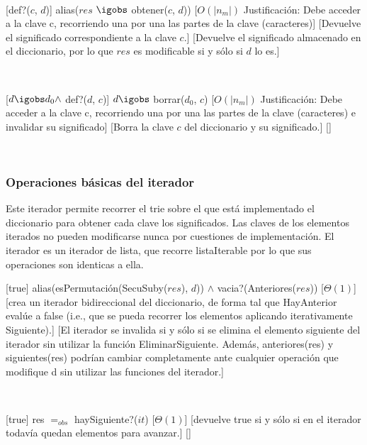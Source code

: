 ~

[def?($c$, $d$)]
{alias($res$ $\igobs$ obtener($c$, $d$))}
[$O(|n_m|)$ Justificación: Debe acceder a la clave c, recorriendo una por una las partes de la clave (caracteres)]
[Devuelve el significado correspondiente a la clave $c$.]
[Devuelve el significado almacenado en el diccionario, por lo que $res$ es modificable si y sólo si $d$ lo es.]

~

[$ d \igobs d_0 \land $ def?($d$, $c$)]
{$ d \igobs$ borrar($d_0$, $c$)}
[$O(|n_m|)$ Justificación: Debe acceder a la clave c, recorriendo una por una las partes de la clave (caracteres) e invalidar su significado]
[Borra la clave $c$ del diccionario y su significado.]
[]

~

\subsubsection{Operaciones básicas del iterador}

Este iterador permite recorrer el trie sobre el que est\'{a} implementado el diccionario para obtener cada clave los significados. Las claves de los elementos iterados no
pueden modificarse nunca por cuestiones de implementación. El iterador es un iterador de lista, que recorre listaIterable por lo que sus operaciones son identicas a ella.

[true]
{alias(esPermutación(SecuSuby($res$), $d$)) $\land$ vacia?(Anteriores($res$))}
[$\Theta(1)$]
[crea un iterador bidireccional del diccionario, de forma tal que HayAnterior evalúe a false (i.e.,
que se pueda recorrer los elementos aplicando iterativamente Siguiente).]
[El iterador se invalida si y sólo si se elimina el elemento siguiente del iterador sin utilizar la función
EliminarSiguiente. Además, anteriores(res) y siguientes(res) podrían cambiar completamente ante cualquier
operación que modifique d sin utilizar las funciones del iterador.]

~

[true]
{res $=_{obs}$ haySiguiente?($it$)}
[$\Theta(1)$]
[devuelve true si y sólo si en el iterador todavía quedan elementos para avanzar.]
[]

~

